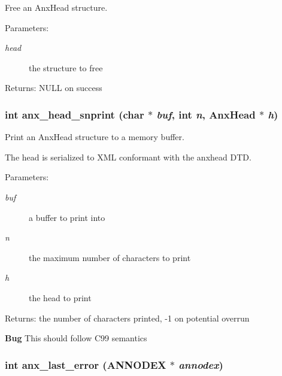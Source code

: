 Free an Anx\-Head structure. 

\begin{Desc}
\item[Parameters:]
\begin{description}
\item[{\em head}]the structure to free \end{description}
\end{Desc}
\begin{Desc}
\item[Returns:]NULL on success \end{Desc}
\subsubsection{\setlength{\rightskip}{0pt plus 5cm}int anx\_\-head\_\-snprint (char $\ast$ {\em buf}, int {\em n}, Anx\-Head $\ast$ {\em h})}\label{anx__general_8h_a19}


Print an Anx\-Head structure to a memory buffer. 

The head is serialized to XML conformant with the anxhead DTD. \begin{Desc}
\item[Parameters:]
\begin{description}
\item[{\em buf}]a buffer to print into \item[{\em n}]the maximum number of characters to print \item[{\em h}]the head to print \end{description}
\end{Desc}
\begin{Desc}
\item[Returns:]the number of characters printed, -1 on potential overrun \end{Desc}
\begin{Desc}
\item[{\bf Bug}]This should follow C99 semantics \end{Desc}
\subsubsection{\setlength{\rightskip}{0pt plus 5cm}int anx\_\-last\_\-error ({\bf ANNODEX} $\ast$ {\em annodex})}\label{anx__general_8h_a1}


